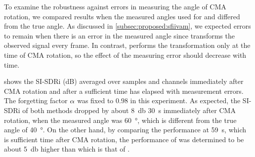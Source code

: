 \documentclass[sip,biber]{now-journal}
\begin{document}
To examine the robustness against errors in measuring the angle of CMA rotation, we compared results when the measured angles used for \SFIIVAo{} and \SFIIVAm{} differed from the true angle.
As discussed in \cref{subsec:proposed:sfiivam}, we expected errors to remain when there is an error in the measured angle since \SFIIVAo{} transforms the observed signal every frame.
In contrast, \SFIIVAm{} performs the transformation only at the time of CMA rotation, so the effect of the measuring error should decrease with time.

 shows the SI-SDRi (dB) averaged over samples and channels immediately after CMA rotation and after a sufficient time has elapsed with measurement errors.
The forgetting factor $\alpha$ was fixed to $0.98$ in this experiment.
As expected, the SI-SDRi of both methods dropped by about \SI{8}{\decibel} \SI{30}{\second} immediately after CMA rotation,
when the measured angle was \SI{60}{\degree}, which is different from the true angle of \SI{40}{\degree}.
On the other hand, by comparing the performance at \SI{59}{\second}, which is sufficient time after CMA rotation, the performance of \SFIIVAm{} was determined to be about \SI{5}{\decibel} higher than which is that of \SFIIVAo{}.
\end{document}
